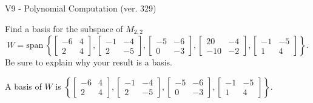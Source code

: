 \begin{exercise}
  \begin{exerciseTitle}V9 - Polynomial Computation (ver. 329)\end{exerciseTitle}
  \begin{exerciseStatement}
    Find a basis for the subspace of \(M_{2,2}\) 
\[W=\mathrm{span}\ \left\{\left[\begin{array}{cc}
-6 & 4 \\
2 & 4
\end{array}\right] , \left[\begin{array}{cc}
-1 & -4 \\
2 & -5
\end{array}\right] , \left[\begin{array}{cc}
-5 & -6 \\
0 & -3
\end{array}\right] , \left[\begin{array}{cc}
20 & -4 \\
-10 & -2
\end{array}\right] , \left[\begin{array}{cc}
-1 & -5 \\
1 & 4
\end{array}\right]\right\}.\]
 Be sure to explain why your result is a basis.


  \end{exerciseStatement}
  \begin{exerciseAnswer}
   A basis of \(W\) is  \(\left\{\left[\begin{array}{cc}
-6 & 4 \\
2 & 4
\end{array}\right] , \left[\begin{array}{cc}
-1 & -4 \\
2 & -5
\end{array}\right] , \left[\begin{array}{cc}
-5 & -6 \\
0 & -3
\end{array}\right] , \left[\begin{array}{cc}
-1 & -5 \\
1 & 4
\end{array}\right]\right\}\).
  


  \end{exerciseAnswer}
\end{exercise}